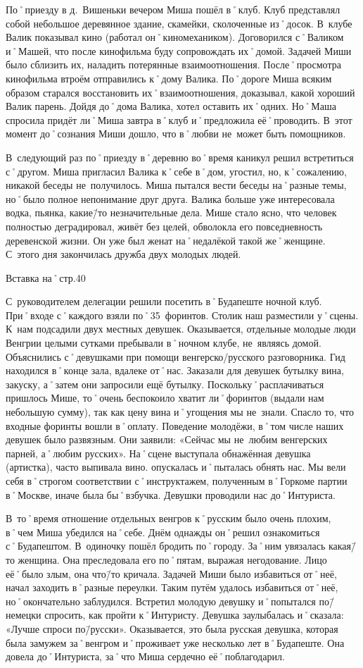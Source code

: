 По˚приезду в д.~Вишеньки вечером Миша пошёл в˚клуб. Клуб представлял собой небольшое деревянное здание, скамейки, сколоченные из˚досок. В~клубе Валик показывал кино (работал он˚киномехаником). Договорился с˚Валиком и˚Машей, что после кинофильма буду сопровождать их˚домой. Задачей Миши было сблизить их, наладить потерянные взаимоотношения. После˚просмотра кинофильма втроём отправились к˚дому Валика. По˚дороге Миша всяким образом старался восстановить их˚взаимоотношения, доказывал, какой хороший Валик парень. Дойдя до˚дома Валика, хотел оставить их˚одних. Но˚Маша спросила придёт ли˚Миша завтра в˚клуб и˚предложила её˚проводить. В~этот момент до˚сознания Миши дошло, что в˚любви не~может быть помощников.

В~следующий раз по˚приезду в˚деревню во˚время каникул решил встретиться с˚другом. Миша пригласил Валика к˚себе в˚дом, угостил, но, к˚сожалению, никакой беседы не~получилось. Миша пытался вести беседы на˚разные темы, но˚было полное непонимание друг друга. Валика больше уже интересовала водка, пьянка, какие\=/то незначительные дела. Мише стало ясно, что человек полностью деградировал, живёт без целей, обволокла его повседневность деревенской жизни. Он уже был женат на˚недалёкой такой же˚женщине. С~этого дня закончилась дружба двух молодых людей.

Вставка на˚стр.40

С~руководителем делегации решили посетить в˚Будапеште ночной клуб. При˚входе с˚каждого взяли по˚35~форинтов. Столик наш разместили у˚сцены. К~нам подсадили двух местных девушек. Оказывается, отдельные молодые люди Венгрии целыми сутками пребывали в˚ночном клубе, не~являясь домой. Объяснились с˚девушками при помощи венгерско\-/русского разговорника. Гид находился в˚конце зала, вдалеке от˚нас. Заказали для девушек бутылку вина, закуску, а˚затем они запросили ещё бутылку. Поскольку˚расплачиваться пришлось Мише, то˚очень беспокоило хватит ли˚форинтов (выдали нам небольшую сумму), так как цену вина и˚угощения мы не~знали. Спасло то, что входные форинты вошли в˚оплату. Поведение молодёжи, в˚том числе наших девушек было развязным. Они заявили: «Сейчас мы не~любим венгерских парней, а˚любим русских». На˚сцене выступала обнажённая девушка (артистка), часто выпивала вино. опускалась и˚пыталась обнять нас. Мы вели себя в˚строгом соответствии с˚инструктажем, полученным в˚Горкоме партии в˚Москве, иначе была бы˚взбучка. Девушки проводили нас до˚Интуриста. 

В~то˚время отношение отдельных венгров к˚русским было очень плохим, в˚чем Миша убедился на˚себе.
Днём однажды он˚решил ознакомиться с˚Будапештом. В~одиночку пошёл бродить по˚городу. За˚ним увязалась какая\=/то женщина. Она преследовала его по˚пятам, выражая негодование. Лицо её˚было злым, она что\=/то кричала. Задачей Миши было избавиться от˚неё, начал заходить в˚разные переулки. Таким путём удалось избавиться от˚неё, но˚окончательно заблудился. Встретил молодую девушку и˚попытался по\=/немецки спросить, как пройти к˚Интуристу. Девушка заулыбалась и˚сказала: «Лучше спроси по\=/русски». Оказывается, это была русская девушка, которая была замужем за˚венгром и˚проживает уже несколько лет в˚Будапеште. Она довела до˚Интуриста, за˚что Миша сердечно её˚поблагодарил. 

